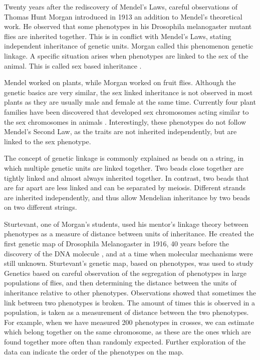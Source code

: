 Twenty years after the rediscovery of Mendel's Laws, careful observations of Thomas Hunt Morgan introduced in 1913 
an addition to Mendel's theoretical work. He observed that some phenotypes in his Drosophila melanogaster mutant 
flies are inherited together. This is in conflict with Mendel's Laws, stating independent inheritance of genetic 
units. Morgan called this phenomenon genetic linkage. A specific situation arises when phenotypes are linked to 
the sex of the animal. This is called sex based inheritance \cite{Morgan:1915, Morgan:1916}.

Mendel worked on plants, while Morgan worked on fruit flies. Although the genetic basics are very similar, the sex 
linked inheritance is not observed in most plants as they are usually male and female at the same time. Currently 
four plant families have been discovered that developed sex chromosomes acting similar to the sex chromosomes in 
animals \cite{Ming:2007}. Interestingly, these phenotypes do not follow Mendel's Second Law, as the traits are not 
inherited independently, but are linked to the sex phenotype. 

The concept of genetic linkage is commonly explained as beads on a string, in which multiple genetic units are 
linked together.  Two beads close together are tightly linked and almost always inherited together. In contrast, 
two beads that are far apart are less linked and can be separated by meiosis. Different strands are inherited 
independently, and thus allow Mendelian inheritance by two beads on two different strings. 

Sturtevant, one of Morgan's students, used his mentor's linkage theory between phenotypes as a measure of distance 
between units of inheritance. He created the first genetic map of Drosophila Melanogaster in 1916, 40 years before 
the discovery of the DNA molecule \cite{Morgan:1916}, and at a time when molecular mechanisms were still unknown. 
Sturtevant's genetic map, based on phenotypes, was used to study Genetics based on careful observation of the 
segregation of phenotypes in large populations of flies, and then determining the distance between the units of 
inheritance relative to other phenotypes. Observations showed that sometimes the link between two phenotypes is 
broken. The amount of times this is observed in a population, is taken as a measurement of distance between the 
two phenotypes. For example, when we have measured 200 phenotypes in crosses, we can estimate which belong together 
on the same chromosome, as these are the ones which are found together more often than randomly expected. Further 
exploration of the data can indicate the order of the phenotypes on the map.

